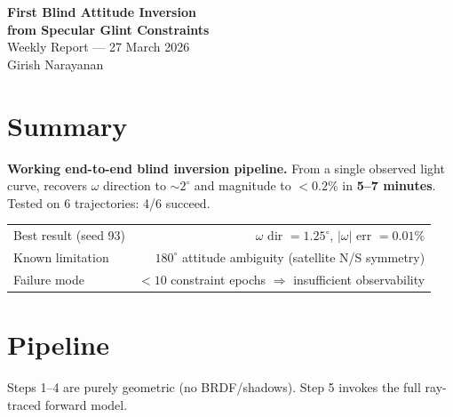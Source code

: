 \documentclass[11pt,a4paper]{article}
\begin{document}
\begin{center}
  {\LARGE\bfseries First Blind Attitude Inversion\\[0.2em] from Specular Glint Constraints}\\[0.5em]
  {\large Weekly Report --- 27 March 2026}\\[0.3em]
  Girish Narayanan
\end{center}
\vspace{0.5em}

\section{Summary}

\textbf{Working end-to-end blind inversion pipeline.} From a single observed
light curve, recovers $\omega$ direction to ${\sim}2^\circ$ and magnitude to
$< 0.2\%$ in \textbf{5--7 minutes}. Tested on 6 trajectories: 4/6 succeed.

\begin{center}
\begin{tabular}{@{}lr@{}}
\toprule
Best result (seed 93) & $\omega$ dir $= 1.25^\circ$, $|\omega|$ err $= 0.01\%$ \\
Known limitation & $180^\circ$ attitude ambiguity (satellite N/S symmetry) \\
Failure mode & $< 10$ constraint epochs $\Rightarrow$ insufficient observability \\
\bottomrule
\end{tabular}
\end{center}

\section{Pipeline}

Steps 1--4 are purely geometric (no BRDF/shadows). Step 5 invokes the full
ray-traced forward model.
\end{document}
